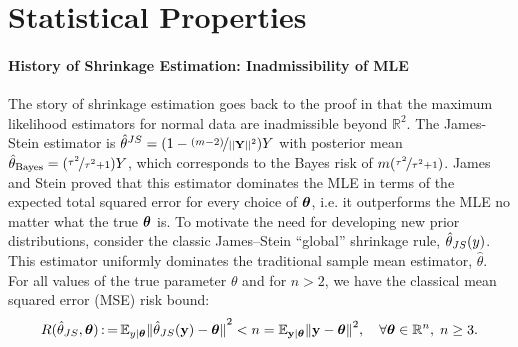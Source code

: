 \documentclass[11pt]{article}
\begin{document}
\section{Statistical Properties}\label{sec:stat-prop}

\paragraph{History of Shrinkage Estimation: Inadmissibility of MLE } The story of shrinkage estimation goes back to the proof in \citet{stein_inadmissibility_1956} that the maximum likelihood estimators for normal data are inadmissible beyond $\mathbb{R}^2$. The James-Stein estimator is $\hat{\theta}^{JS} = (1 - \nicefrac{(m-2)}{\left|\left|{\bf Y}\right|\right|^2})Y$ with posterior mean $\hat{\theta}_{\mathrm{Bayes}} = (\nicefrac{\tau^2}{\tau^2+1}) Y$, which corresponds to the Bayes risk of $m(\nicefrac{\tau^2}{\tau^2+1})$. %
James and Stein proved that this estimator dominates the MLE in terms of the expected total squared error for every choice of $\boldsymbol{\theta}$, i.e. it outperforms the MLE no matter what the true $\boldsymbol{\theta}$ is. To motivate the need for developing new prior distributions, consider the classic James--Stein ``global'' shrinkage rule, ${\hat{\theta}}_{JS}{}(y)$. This estimator uniformly dominates the traditional sample mean estimator, $\hat{\theta}$. For all values of the true parameter $\theta$ and for $n>2$, we have the classical mean squared error (MSE) risk bound:
\[
R({\hat{\theta}}_{JS}{}, \boldsymbol{\theta}) \operatorname{:=} \mathbb E_{y \mid \boldsymbol{\theta}} {\Vert {\hat{\theta}}_{JS}{}({\bf y}) - \boldsymbol{\theta} \Vert}^2 < n = \mathbb E_{{\bf y} \mid \boldsymbol{\theta}} {\Vert {\bf y} - \boldsymbol{\theta} \Vert}^2, \quad \forall \boldsymbol{\theta} \in \mathbb{R}^n, \; n \ge 3.
\]
\end{document}
